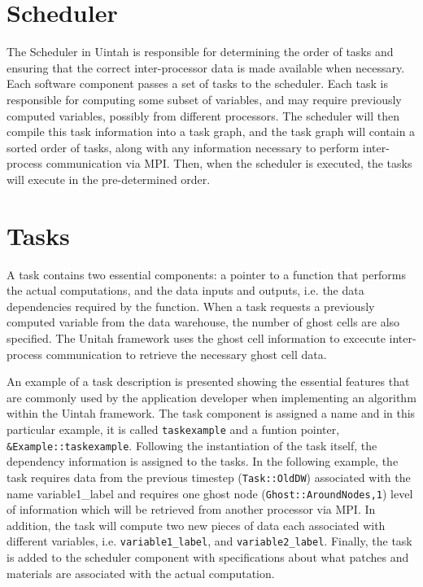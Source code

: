 \documentclass[12pt]{report}
\begin{document}
\section{Scheduler}

The Scheduler in Uintah is responsible for determining the order of
tasks and ensuring that the correct inter-processor data is made
available when necessary. Each software component passes a set of
tasks to the scheduler. Each task is responsible for computing some
subset of variables, and may require previously computed variables,
possibly from different processors. The scheduler will then compile
this task information into a task graph, and the task graph will
contain a sorted order of tasks, along with any information necessary
to perform inter-process communication via MPI. Then, when the
scheduler is executed, the tasks will execute in the pre-determined
order.

\section{Tasks}

A task contains two essential components: a pointer to a function
that performs the actual computations, and the data inputs and
outputs, i.e. the data dependencies required by the function.  When a
task requests a previously computed variable from the data warehouse,
the number of ghost cells are also specified.  The Unitah framework
uses the ghost cell information to excecute inter-process
communication to retrieve the necessary ghost cell data.

An example of a task description is presented showing the essential
features that are commonly used by the application developer when
implementing an algorithm within the Uintah framework.  The task
component is assigned a name and in this particular example, it is
called \texttt{taskexample} and a funtion pointer,
\texttt{\&Example::taskexample}.  Following the instantiation of the
task itself, the dependency information is assigned to the tasks.  In
the following example, the task requires data from the previous
timestep (\texttt{Task::OldDW}) associated with the name
variable1\_label and requires one ghost node
(\texttt{Ghost::AroundNodes,1}) level of information which will be
retrieved from another processor via MPI.  In addition, the task will
compute two new pieces of data each associated with different
variables, i.e. \texttt{variable1\_label}, and
\texttt{variable2\_label}.  Finally, the task is added to the scheduler
component with specifications about what patches and materials are
associated with the actual computation.
\end{document}

